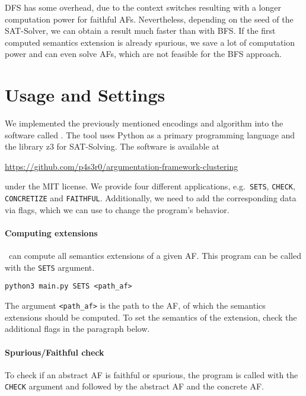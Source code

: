 DFS has some overhead, due to the context switches resulting with a longer computation power for faithful AFs. Nevertheless, depending on the seed of the SAT-Solver, we can obtain a result much faster than with BFS. If the first computed semantics extension is already spurious, we save a lot of computation power and can even solve AFs, which are not feasible for the BFS approach.





\section{Usage and Settings}
We implemented the previously mentioned encodings and algorithm into the software called \prog. The tool uses Python as a primary programming language and the library z3 for SAT-Solving. The software is available at

\begin{center}
    \url{https://github.com/p4s3r0/argumentation-framework-clustering}
\end{center}

under the MIT license. We provide four different applications, e.g.\ \texttt{SETS}, \texttt{CHECK}, \texttt{CONCRETIZE} and \texttt{FAITHFUL}. Additionally, we need to add the corresponding data via flags, which we can use to change the program's behavior.

\paragraph{Computing extensions} \prog\ can compute all semantics extensions of a given AF. This program can be called with the \texttt{SETS} argument.

\begin{center}
    \texttt{python3 main.py SETS <path\_af>}
\end{center}

The argument \texttt{<path\_af>} is the path to the AF, of which the semantics extensions should be computed. To set the semantics of the extension, check the additional flags in the paragraph below.

\paragraph{Spurious/Faithful check} To check if an abstract AF is faithful or spurious, the program is called with the \texttt{CHECK} argument and followed by the abstract AF and the concrete AF.

